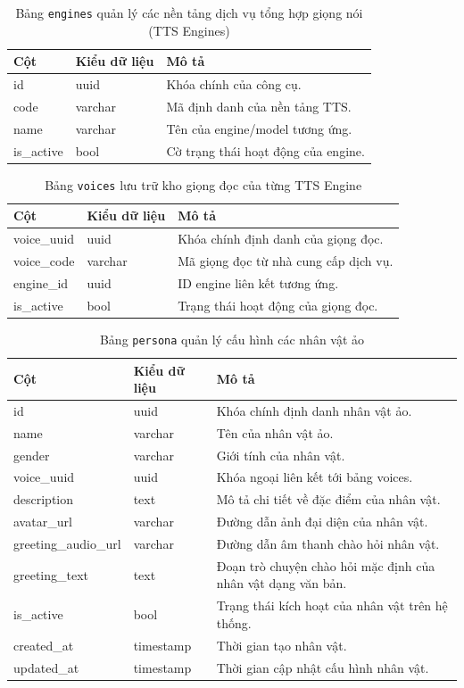 \begin{table}[H]
\centering
\begin{tabular}{|l|l|p{6cm}|}
\hline
\textbf{Cột} & \textbf{Kiểu dữ liệu} & \textbf{Mô tả} \\ \hline
id & uuid & Khóa chính của công cụ. \\ \hline
code & varchar & Mã định danh của nền tảng TTS. \\ \hline
name & varchar & Tên của engine/model tương ứng. \\ \hline
is\_active & bool & Cờ trạng thái hoạt động của engine. \\ \hline
\end{tabular}
\caption{Bảng \texttt{engines} quản lý các nền tảng dịch vụ tổng hợp giọng nói (TTS Engines)}
\end{table}

\begin{table}[H]
\centering
\begin{tabular}{|l|l|p{6cm}|}
\hline
\textbf{Cột} & \textbf{Kiểu dữ liệu} & \textbf{Mô tả} \\ \hline
voice\_uuid & uuid & Khóa chính định danh của giọng đọc. \\ \hline
voice\_code & varchar & Mã giọng đọc từ nhà cung cấp dịch vụ. \\ \hline
engine\_id & uuid & ID engine liên kết tương ứng. \\ \hline
is\_active & bool & Trạng thái hoạt động của giọng đọc. \\ \hline
\end{tabular}
\caption{Bảng \texttt{voices} lưu trữ kho giọng đọc của từng TTS Engine}
\end{table}

\begin{table}[H]
\centering
\begin{tabular}{|l|l|p{6cm}|}
\hline
\textbf{Cột} & \textbf{Kiểu dữ liệu} & \textbf{Mô tả} \\ \hline
id & uuid & Khóa chính định danh nhân vật ảo. \\ \hline
name & varchar & Tên của nhân vật ảo. \\ \hline
gender & varchar & Giới tính của nhân vật. \\ \hline
voice\_uuid & uuid & Khóa ngoại liên kết tới bảng voices. \\ \hline
description & text & Mô tả chi tiết về đặc điểm của nhân vật. \\ \hline
avatar\_url & varchar & Đường dẫn ảnh đại diện của nhân vật. \\ \hline
greeting\_audio\_url & varchar & Đường dẫn âm thanh chào hỏi nhân vật. \\ \hline
greeting\_text & text & Đoạn trò chuyện chào hỏi mặc định của nhân vật dạng văn bản. \\ \hline
is\_active & bool & Trạng thái kích hoạt của nhân vật trên hệ thống. \\ \hline
created\_at & timestamp & Thời gian tạo nhân vật. \\ \hline
updated\_at & timestamp & Thời gian cập nhật cấu hình nhân vật. \\ \hline
\end{tabular}
\caption{Bảng \texttt{persona} quản lý cấu hình các nhân vật ảo}
\end{table}
